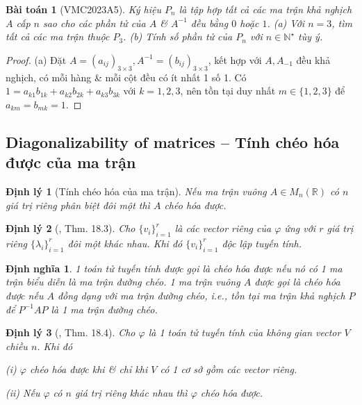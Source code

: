 \documentclass{article}
\newtheorem{baitoan}{Bài toán}
\newtheorem{dinhly}{Định lý}
\newtheorem{dinhnghia}{Định nghĩa}
\begin{document}
\begin{baitoan}[VMC2023A5]
	Ký hiệu $P_n$ là tập hợp tất cả các ma trận khả nghịch $A$ cấp $n$ sao cho các phần tử của $A$ \& $A^{-1}$ đều bằng $0$ hoặc $1$. (a) Với $n = 3$, tìm tất cả các ma trận thuộc $P_3$. (b) Tính số phần tử của $P_n$ với $n\in\mathbb{N}^\star$ tùy ý.
\end{baitoan}

\begin{proof}
	(a) Đặt $A = (a_{ij})_{3\times3},A^{-1} = (b_{ij})_{3\times3}$, kết hợp với $A,A_{-1}$ đều khả nghịch, có mỗi hàng \& mỗi cột đều có ít nhất 1 số 1. Có $1 = a_{k1}b_{1k} + a_{k2}b_{2k} + a_{k3}b_{3k}$ với $k = 1,2,3$, nên tồn tại duy nhất $m\in\{1,2,3\}$ để $a_{km} = b_{mk} = 1$.
\end{proof}


\subsection{Diagonalizability of matrices -- Tính chéo hóa được của ma trận}

\begin{dinhly}[Tính chéo hóa của ma trận]
	Nếu ma trận vuông $A\in M_n(\mathbb{R})$ có $n$ giá trị riêng phân biệt đôi một thì $A$ chéo hóa được.
\end{dinhly}

\begin{dinhly}[\cite{Hoa_linear_algebra}, Thm. 18.3]
	Cho $\{v_i\}_{i=1}^r$ là các vector riêng của $\varphi$ ứng với $r$ giá trị riêng $\{\lambda_i\}_{i=1}^r$ đôi một khác nhau. Khi đó $\{v_i\}_{i=1}^r$ độc lập tuyến tính.
\end{dinhly}

\begin{dinhnghia}
	1 toán tử tuyến tính được gọi là {\rm chéo hóa được} nếu nó có 1 ma trận biểu diễn là ma trận đường chéo. 1 ma trận vuông $A$ được gọi là {\rm chéo hóa được} nếu $A$ đồng dạng với ma trận đường chéo, i.e., tồn tại ma trận khả nghịch $P$ để $P^{-1}AP$ là 1 ma trận đường chéo.
\end{dinhnghia}

\begin{dinhly}[\cite{Hoa_linear_algebra}, Thm. 18.4]
	Cho $\varphi$ là 1 toán tử tuyến tính của không gian vector $V$ chiều $n$. Khi đó
	\item(i) $\varphi$ chéo hóa được khi \& chỉ khi $V$ có 1 cơ sở gồm các vector riêng.
	\item(ii) Nếu $\varphi$ có $n$ giá trị riêng khác nhau thì $\varphi$ chéo hóa được.
\end{dinhly}
\end{document}
